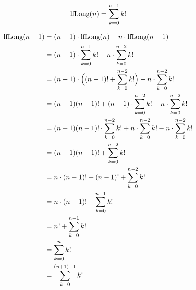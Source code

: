 \documentclass{lehramt-informatik-aufgabe}
\begin{document}
\begin{enumerate}
\begin{liAntwort}
\begin{displaymath}
\text{lfLong}(n) = \sum^{n-1}_{k=0}k!
\end{displaymath}

%

\liInduktionSchritt

\begin{equation*}
\begin{split}
\text{lfLong}(n+1) & = (n+1) \cdot \text{lfLong}(n) - n \cdot \text{lfLong}(n-1) \\
& = (n+1) \cdot \sum^{n-1}_{k=0}k! - n \cdot \sum^{n-2}_{k=0}k! \\
& = (n+1) \cdot \Big((n-1)! + \sum^{n-2}_{k=0}k!\Big) - n \cdot \sum^{n-2}_{k=0}k! \\
& = (n+1)(n-1)! + (n+1) \cdot \sum^{n-2}_{k=0}k! - n \cdot \sum^{n-2}_{k=0}k! \\
& = (n+1)(n-1)! \cdot \sum^{n-2}_{k=0}k! + n \cdot \sum^{n-2}_{k=0}k! - n \cdot \sum^{n-2}_{k=0}k! \\
& = (n+1)(n-1)! + \sum^{n-2}_{k=0}k! \\
& = n \cdot (n-1)! + (n-1)! + \sum^{n-2}_{k=0}k! \\
& = n \cdot (n-1)! + \sum^{n-1}_{k=0}k! \\
& = n! + \sum^{n-1}_{k=0}k! \\
& = \sum^{n}_{k=0}k! \\
& = \sum^{(n+1)-1}_{k=0}k!
\end{split}
\end{equation*}
\end{liAntwort}

\begin{liAntwort}

\end{liAntwort}

\end{enumerate}
\end{document}
